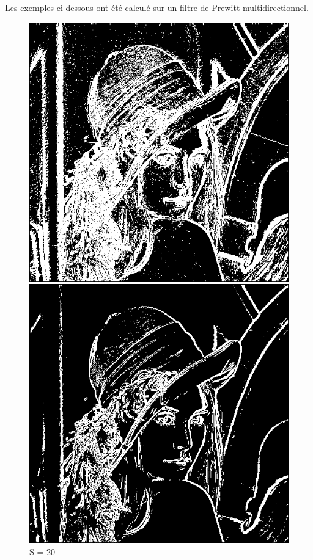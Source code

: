 \documentclass[11pt]{article}
\begin{document}
	Les exemples ci-dessous ont été calculé sur un filtre de Prewitt multidirectionnel.
	\begin{figure}[H]
		\begin{minipage}[c]{.30\linewidth}
			\centering
			\includegraphics[scale=0.15]{Image/seuilFixe20.png}
			\caption{S = 20}
			\label{fig:seuilFixe20}
		\end{minipage} \hfill
		\begin{minipage}[c]{.30\linewidth}
			\centering
			\includegraphics[scale=0.15]{Image/seuilFixe50.png}

\end{minipage}
\end{figure}
\end{document}
